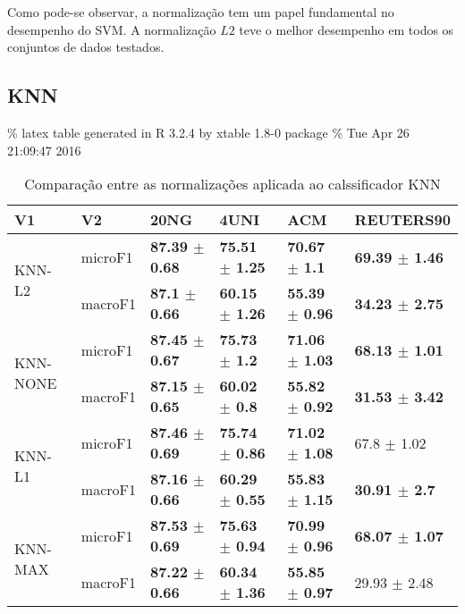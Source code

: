 \documentclass[]{article}
\begin{document}
Como pode-se observar, a normalização tem um papel fundamental no
desempenho do SVM. A normalização \(L2\) teve o melhor desempenho em
todos os conjuntos de dados testados.

\subsection{KNN}\label{knn}

\% latex table generated in R 3.2.4 by xtable 1.8-0 package \% Tue Apr
26 21:09:47 2016

\begin{table}[ht]
\centering
\begin{tabular}{llllll}
  \hline
V1 & V2 & 20NG & 4UNI & ACM & REUTERS90 \\ 
  \cline{3-6} \hline
\multirow{2}{*}{KNN-L2} & microF1 & \bf{87.39 $\pm$  0.68} & \bf{75.51 $\pm$  1.25} & \bf{70.67 $\pm$  1.1} & \bf{69.39 $\pm$  1.46} \\ 
   & macroF1 & \bf{87.1 $\pm$  0.66} & \bf{60.15 $\pm$  1.26} & \bf{55.39 $\pm$  0.96} & \bf{34.23 $\pm$  2.75} \\ 
   \cline{3-6}\multirow{2}{*}{KNN-NONE} & microF1 & \bf{87.45 $\pm$  0.67} & \bf{75.73 $\pm$  1.2} & \bf{71.06 $\pm$  1.03} & \bf{68.13 $\pm$  1.01} \\ 
   & macroF1 & \bf{87.15 $\pm$  0.65} & \bf{60.02 $\pm$  0.8} & \bf{55.82 $\pm$  0.92} & \bf{31.53 $\pm$  3.42} \\ 
   \cline{3-6}\multirow{2}{*}{KNN-L1} & microF1 & \bf{87.46 $\pm$  0.69} & \bf{75.74 $\pm$  0.86} & \bf{71.02 $\pm$  1.08} & 67.8 $\pm$  1.02 \\ 
   & macroF1 & \bf{87.16 $\pm$  0.66} & \bf{60.29 $\pm$  0.55} & \bf{55.83 $\pm$  1.15} & \bf{30.91 $\pm$  2.7} \\ 
   \cline{3-6}\multirow{2}{*}{KNN-MAX} & microF1 & \bf{87.53 $\pm$  0.69} & \bf{75.63 $\pm$  0.94} & \bf{70.99 $\pm$  0.96} & \bf{68.07 $\pm$  1.07} \\ 
   & macroF1 & \bf{87.22 $\pm$  0.66} & \bf{60.34 $\pm$  1.36} & \bf{55.85 $\pm$  0.97} & 29.93 $\pm$  2.48 \\ 
   \cline{3-6}\end{tabular}
\caption{Comparação entre as normalizações aplicada ao calssificador KNN} 
\end{table}
\end{document}
